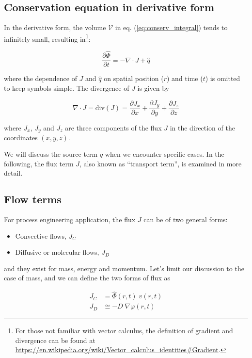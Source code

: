 \documentclass[a4paper,11pt]{article}
\theoremstyle{definition}
\begin{document}
\subsection*{Conservation equation in derivative form}

In the derivative form, the volume $\mathcal{V}$ in eq. (\ref{eq:conserv_integral}) tends to infinitely small,
resulting in\footnote{For those not familiar with vector calculus, the definition of gradient and divergence
can be found at \url{https://en.wikipedia.org/wiki/Vector_calculus_identities#Gradient}.}:

\begin{equation} \label{eq:conserv_deriv}
	\frac{\partial \hat{\Phi}}{\partial t} = - \nabla \cdot J + \hat{q}
\end{equation}

\noindent where the dependence of $J$ and $\hat{q}$ on spatial position ($r$) and time ($t$) 
is omitted to keep symbols simple. The divergence of $J$ is given by

\begin{equation} \label{eq:divg}
	\nabla \cdot J  = \textrm{div}(J) = \frac{\partial J_x}{\partial x} + \frac{\partial J_y}{\partial y} + \frac{\partial J_z}{\partial z}
\end{equation}

\noindent where $J_x$, $J_y$ and $J_z$ are three components of the flux $J$ in the direction of the coordinates $(x, y, z)$.

We will discuss the source term $q$ when we encounter specific cases. In the following, the flux term $J$, also known as ``transport term'', 
is examined in more detail.

\subsection*{Flow terms}

For process engineering application, the flux $J$ can be of two general forms:
\begin{itemize}
	\item Convective flows, $J_C$
	\item Diffusive or molecular flows, $J_D$
\end{itemize}
\noindent and they exist for mass, energy and momentum. Let's limit our discussion to the case of mass,
and we can define the two forms of flux as

\begin{align}
	J_C &= \hat{\Phi}(r, t) \; v(r, t) \label{eq:Jc} \\
	J_D &\cong -D \; \nabla \varphi(r, t) \label{eq:Jd}
\end{align}
\end{document}
